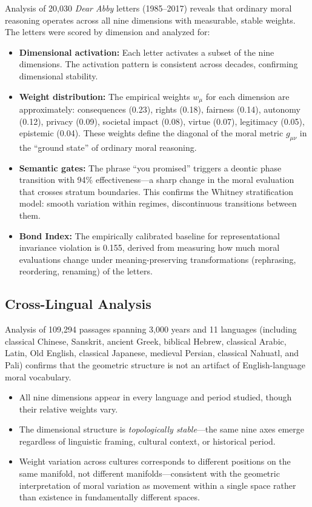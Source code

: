 \documentclass[12pt,letterpaper]{article}
\theoremstyle{definition}
\theoremstyle{remark}
\begin{document}
Analysis of 20,030 \emph{Dear Abby} letters (1985--2017) reveals that ordinary moral reasoning operates across all nine dimensions with measurable, stable weights. The letters were scored by dimension and analyzed for:

\begin{itemize}
    \item \textbf{Dimensional activation:} Each letter activates a subset of the nine dimensions. The activation pattern is consistent across decades, confirming dimensional stability.
    \item \textbf{Weight distribution:} The empirical weights $w_\mu$ for each dimension are approximately: consequences (0.23), rights (0.18), fairness (0.14), autonomy (0.12), privacy (0.09), societal impact (0.08), virtue (0.07), legitimacy (0.05), epistemic (0.04). These weights define the diagonal of the moral metric $g_{\mu\nu}$ in the ``ground state'' of ordinary moral reasoning.
    \item \textbf{Semantic gates:} The phrase ``you promised'' triggers a deontic phase transition with 94\% effectiveness---a sharp change in the moral evaluation that crosses stratum boundaries. This confirms the Whitney stratification model: smooth variation within regimes, discontinuous transitions between them.
    \item \textbf{Bond Index:} The empirically calibrated baseline for representational invariance violation is 0.155, derived from measuring how much moral evaluations change under meaning-preserving transformations (rephrasing, reordering, renaming) of the letters.
\end{itemize}

\subsection{Cross-Lingual Analysis}

Analysis of 109,294 passages spanning 3,000 years and 11 languages (including classical Chinese, Sanskrit, ancient Greek, biblical Hebrew, classical Arabic, Latin, Old English, classical Japanese, medieval Persian, classical Nahuatl, and Pali) confirms that the geometric structure is not an artifact of English-language moral vocabulary.

\begin{itemize}
    \item All nine dimensions appear in every language and period studied, though their relative weights vary.
    \item The dimensional structure is \emph{topologically stable}---the same nine axes emerge regardless of linguistic framing, cultural context, or historical period.
    \item Weight variation across cultures corresponds to different positions on the same manifold, not different manifolds---consistent with the geometric interpretation of moral variation as movement within a single space rather than existence in fundamentally different spaces.
\end{itemize}
\end{document}
